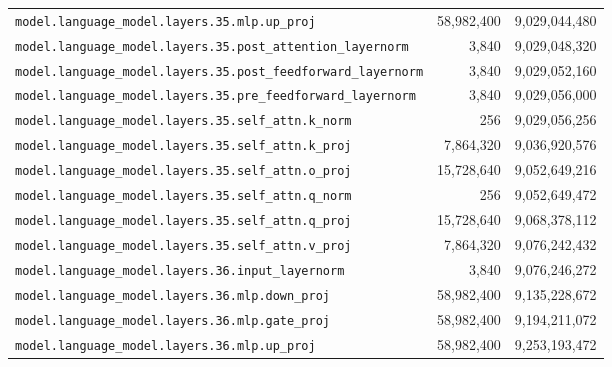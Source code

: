 \documentclass[10pt,a4paper]{article}
\theoremstyle{definition}
\begin{document}
\begin{appendices}
\begin{longtable}{p{9.5cm}rr}
\texttt{model.\allowbreak{}language\_model.\allowbreak{}layers.\allowbreak{}35.\allowbreak{}mlp.\allowbreak{}up\_proj} & 58,982,400 & 9,029,044,480 \\
\texttt{model.\allowbreak{}language\_model.\allowbreak{}layers.\allowbreak{}35.\allowbreak{}post\_attention\_layernorm} & 3,840 & 9,029,048,320 \\
\texttt{model.\allowbreak{}language\_model.\allowbreak{}layers.\allowbreak{}35.\allowbreak{}post\_feedforward\_layernorm} & 3,840 & 9,029,052,160 \\
\texttt{model.\allowbreak{}language\_model.\allowbreak{}layers.\allowbreak{}35.\allowbreak{}pre\_feedforward\_layernorm} & 3,840 & 9,029,056,000 \\
\texttt{model.\allowbreak{}language\_model.\allowbreak{}layers.\allowbreak{}35.\allowbreak{}self\_attn.\allowbreak{}k\_norm} & 256 & 9,029,056,256 \\
\texttt{model.\allowbreak{}language\_model.\allowbreak{}layers.\allowbreak{}35.\allowbreak{}self\_attn.\allowbreak{}k\_proj} & 7,864,320 & 9,036,920,576 \\
\texttt{model.\allowbreak{}language\_model.\allowbreak{}layers.\allowbreak{}35.\allowbreak{}self\_attn.\allowbreak{}o\_proj} & 15,728,640 & 9,052,649,216 \\
\texttt{model.\allowbreak{}language\_model.\allowbreak{}layers.\allowbreak{}35.\allowbreak{}self\_attn.\allowbreak{}q\_norm} & 256 & 9,052,649,472 \\
\texttt{model.\allowbreak{}language\_model.\allowbreak{}layers.\allowbreak{}35.\allowbreak{}self\_attn.\allowbreak{}q\_proj} & 15,728,640 & 9,068,378,112 \\
\texttt{model.\allowbreak{}language\_model.\allowbreak{}layers.\allowbreak{}35.\allowbreak{}self\_attn.\allowbreak{}v\_proj} & 7,864,320 & 9,076,242,432 \\
\texttt{model.\allowbreak{}language\_model.\allowbreak{}layers.\allowbreak{}36.\allowbreak{}input\_layernorm} & 3,840 & 9,076,246,272 \\
\texttt{model.\allowbreak{}language\_model.\allowbreak{}layers.\allowbreak{}36.\allowbreak{}mlp.\allowbreak{}down\_proj} & 58,982,400 & 9,135,228,672 \\
\texttt{model.\allowbreak{}language\_model.\allowbreak{}layers.\allowbreak{}36.\allowbreak{}mlp.\allowbreak{}gate\_proj} & 58,982,400 & 9,194,211,072 \\
\texttt{model.\allowbreak{}language\_model.\allowbreak{}layers.\allowbreak{}36.\allowbreak{}mlp.\allowbreak{}up\_proj} & 58,982,400 & 9,253,193,472 \\

\end{longtable}
\end{appendices}
\end{document}
